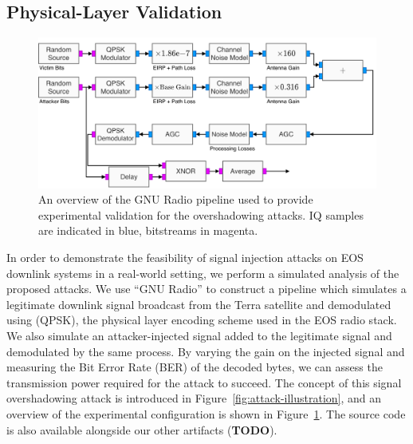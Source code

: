 \subsection{Physical-Layer Validation}\label{sec:physical-layer-validation}

\begin{figure}
    \centering
    \includegraphics[width=\columnwidth]{diagrams/overshadowing_pipeline.pdf}
    \caption{An overview of the GNU Radio pipeline used to provide experimental validation for the overshadowing attacks. IQ samples are indicated in blue, bitstreams in magenta.}
    \label{fig:overshadowing_pipeline}
\end{figure}

In order to demonstrate the feasibility of signal injection attacks on EOS downlink systems in a real-world setting, we perform a simulated analysis of the proposed attacks.
We use ``GNU Radio'' to construct a pipeline which simulates a legitimate downlink signal broadcast from the Terra satellite and demodulated using (QPSK), the physical layer encoding scheme used in the EOS radio stack.
We also simulate an attacker-injected signal added to the legitimate signal and demodulated by the same process.
By varying the gain on the injected signal and measuring the Bit Error Rate (BER) of the decoded bytes, we can assess the transmission power required for the attack to succeed.
The concept of this signal overshadowing attack is introduced in Figure~\ref{fig:attack-illustration}, and an overview of the experimental configuration is shown in Figure~\ref{fig:overshadowing_pipeline}.
The source code is also available alongside our other artifacts (\textbf{TODO}).

